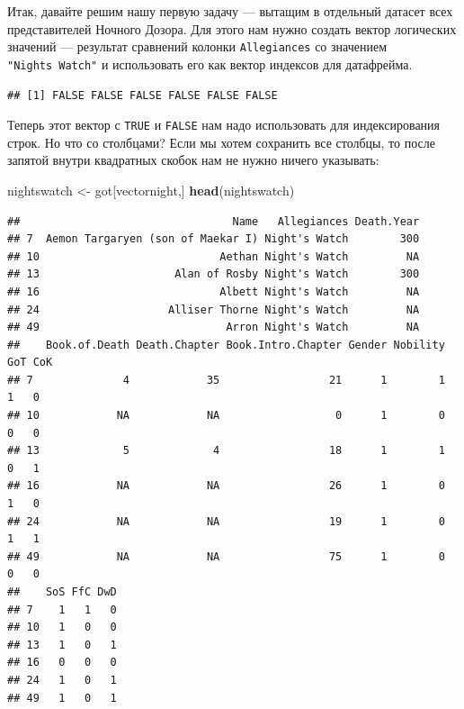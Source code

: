 \documentclass[]{book}
\newenvironment{Shaded}{\begin{snugshade}}{\end{snugshade}}
\newcommand{\KeywordTok}[1]{\textcolor[rgb]{0.13,0.29,0.53}{\textbf{#1}}}
\newcommand{\NormalTok}[1]{#1}
\newcommand{\OperatorTok}[1]{\textcolor[rgb]{0.81,0.36,0.00}{\textbf{#1}}}
\newcommand{\StringTok}[1]{\textcolor[rgb]{0.31,0.60,0.02}{#1}}
\begin{document}
Итак, давайте решим нашу первую задачу --- вытащим в отдельный датасет всех представителей Ночного Дозора.
Для этого нам нужно создать вектор логических значений --- результат сравнений колонки \texttt{Allegiances} со значением \texttt{"Night\textquotesingle{}s\ Watch"} и использовать его как вектор индексов для датафрейма.

\begin{Shaded}
\end{Shaded}

\begin{verbatim}
## [1] FALSE FALSE FALSE FALSE FALSE FALSE
\end{verbatim}

Теперь этот вектор с \texttt{TRUE} и \texttt{FALSE} нам надо использовать для индексирования строк. Но что со столбцами? Если мы хотем сохранить все столбцы, то после запятой внутри квадратных скобок нам не нужно ничего указывать:

\begin{Shaded}
\begin{Highlighting}[]
\NormalTok{nightswatch <-}\StringTok{ }\NormalTok{got[vectornight,]}
\KeywordTok{head}\NormalTok{(nightswatch)}
\end{Highlighting}
\end{Shaded}

\begin{verbatim}
##                                 Name   Allegiances Death.Year
## 7  Aemon Targaryen (son of Maekar I) Night's Watch        300
## 10                            Aethan Night's Watch         NA
## 13                     Alan of Rosby Night's Watch        300
## 16                            Albett Night's Watch         NA
## 24                    Alliser Thorne Night's Watch         NA
## 49                             Arron Night's Watch         NA
##    Book.of.Death Death.Chapter Book.Intro.Chapter Gender Nobility GoT CoK
## 7              4            35                 21      1        1   1   0
## 10            NA            NA                  0      1        0   0   0
## 13             5             4                 18      1        1   0   1
## 16            NA            NA                 26      1        0   1   0
## 24            NA            NA                 19      1        0   1   1
## 49            NA            NA                 75      1        0   0   0
##    SoS FfC DwD
## 7    1   1   0
## 10   1   0   0
## 13   1   0   1
## 16   0   0   0
## 24   1   0   1
## 49   1   0   1
\end{verbatim}
\end{document}
